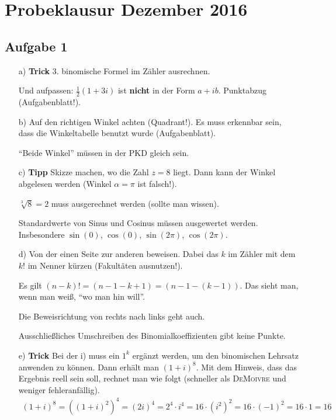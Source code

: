 \documentclass[11pt, a4paper]{article}
\begin{document}
\vspace{1cm}

\begin{center}
\end{center}








\newpage
\section*{Probeklausur Dezember 2016}
\subsection*{Aufgabe 1}
\begin{itemize}
\item[a)] \textbf{Trick} 3. binomische Formel im Zähler ausrechnen. 

Und aufpassen: $\frac{1}{2}(1 + 3i)$ ist \textbf{nicht} in der Form $a+ ib$. Punktabzug (Aufgabenblatt!).

\item[b)] Auf den richtigen Winkel achten (Quadrant!). Es muss erkennbar sein, dass die Winkeltabelle benutzt wurde (Aufgabenblatt). 

\enquote{Beide Winkel} müssen in der PKD gleich sein.

\item[c)] \textbf{Tipp} Skizze machen, wo die Zahl $z = 8$ liegt. Dann kann der Winkel abgelesen werden (Winkel $\alpha = \pi$ ist falsch!).

$\sqrt[3]{8} = 2$ muss ausgerechnet werden (sollte man wissen).

Standardwerte von Sinus und Cosinus müssen ausgewertet werden. Insbesondere $\sin(0)$, $\cos(0)$, $\sin(2\pi)$, $\cos(2\pi)$.

\item[d)] Von der einen Seite zur anderen beweisen. Dabei das $k$ im Zähler mit dem $k!$ im Nenner kürzen (Fakultäten ausnutzen!). 

Es gilt $(n - k)! = (n - 1 - k + 1) =  (n - 1 - (k - 1))$. Das sieht man, wenn man weiß, \enquote{wo man hin will}.

Die Beweisrichtung von rechts nach links geht auch. 

Ausschließliches Umschreiben des Binomialkoeffizienten gibt keine Punkte.

\item[e)] \textbf{Trick} Bei der i) muss ein $1^k$ ergänzt werden, um den binomischen Lehrsatz anwenden zu können. Dann erhält man $(1+i)^8$. Mit dem Hinweis, dass das Ergebnis reell sein soll, rechnet man wie folgt (schneller als \textsc{DeMoivre} und weniger fehleranfällig). 
\begin{align*}
(1+i)^8 = \left((1+i)^2\right)^4 = (2i)^4 = 2^4 \cdot i^4 = 16 \cdot \left(i^2\right)^2 = 16 \cdot (-1)^2 = 16 \cdot 1 = 16
\end{align*}


\end{itemize}
\end{document}
